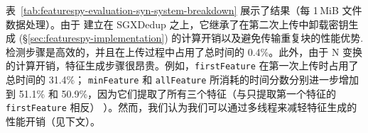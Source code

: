 \begin{table}[t]
    \small
    \centering
    \setlength{\tabcolsep}{5pt}
    \renewcommand{\arraystretch}{1.05}
    \caption{(Exp\#5) 处理合成文件数据每 1\,MiB 的时间分解（单位：ms）。 除括号中明确指定外，第二次上传的每一步所消耗的时间与第一次上传的相同。}
    \label{tab:featurespy-evaluation-syn-system-breakdown}
    \vspace{-6pt}
\end{table}
表~\ref{tab:featurespy-evaluation-syn-system-breakdown} 展示了结果（每 1\,MiB 文件数据处理）。由于 \prototype 建立在 SGXDedup \cite{ren21} 之上，它继承了在第二次上传中卸载密钥生成 (\S\ref{sec:featurespy-implementation}) 的计算开销以及避免传输重复块的性能优势.检测步骤是高效的，并且在上传过程中占用了总时间的 0.4\%。此外，由于 N 变换的计算开销，特征生成步骤很昂贵。例如，{\tt firstFeature} 在第一次上传时占用了总时间的 31.4\%； {\tt minFeature} 和 {\tt allFeature} 所消耗的时间分数分别进一步增加到 51.1\% 和 50.9\%，因为它们提取了所有三个特征（与只提取第一个特征的 {\tt firstFeature} 相反） ）。然而，我们认为我们可以通过多线程来减轻特征生成的性能开销（见下文）。


